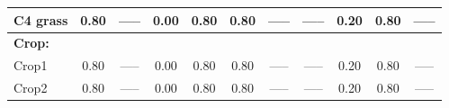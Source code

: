 \begin{landscape}
\begin{table}[htbp]
\begin{tabular}{lcccccccccc}
      C4  grass                             & 0.80                 & -----                & 0.00                 & 0.80               & 0.80                & -----                     & -----                   & 0.20                & 0.80              & -----                     \\ \hline
      \multicolumn{11}{l}{\textbf{Crop:}}  \\
      Crop1                                 & 0.80                 & -----                & 0.00                 & 0.80               & 0.80                & -----                     & -----                   & 0.20                & 0.80              & -----                     \\
      Crop2                                 & 0.80                 & -----                & 0.00                 & 0.80               & 0.80                & -----                     & -----                   & 0.20                & 0.80              & -----                     \\ \bottomrule
    \end{tabular}
  \end{table}
\end{landscape}
